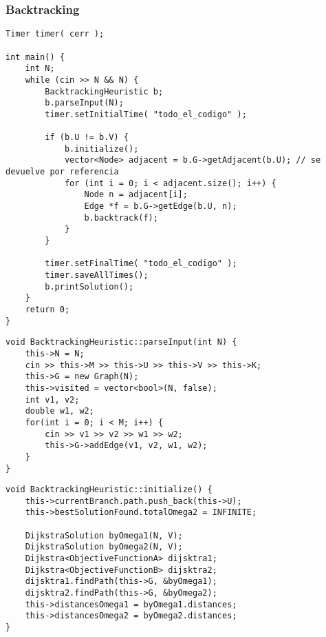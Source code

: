 
\subsubsection{Backtracking}


\begin{lstlisting}[caption=backtracking.cpp]
Timer timer( cerr );

int main() {
    int N;
    while (cin >> N && N) {
        BacktrackingHeuristic b;
        b.parseInput(N);
        timer.setInitialTime( "todo_el_codigo" );
        
        if (b.U != b.V) {
            b.initialize();
            vector<Node> adjacent = b.G->getAdjacent(b.U); // se devuelve por referencia
            for (int i = 0; i < adjacent.size(); i++) {
                Node n = adjacent[i];
                Edge *f = b.G->getEdge(b.U, n);
                b.backtrack(f);
            }
        }
        
        timer.setFinalTime( "todo_el_codigo" );
        timer.saveAllTimes();
        b.printSolution();
    }
    return 0;
}
\end{lstlisting}
\begin{lstlisting}[caption=BacktrackingHeuristic::parseInput()]
void BacktrackingHeuristic::parseInput(int N) {
    this->N = N;
    cin >> this->M >> this->U >> this->V >> this->K;
    this->G = new Graph(N);
    this->visited = vector<bool>(N, false);
    int v1, v2;
    double w1, w2;
    for(int i = 0; i < M; i++) {
        cin >> v1 >> v2 >> w1 >> w2;
        this->G->addEdge(v1, v2, w1, w2);
    }
}
\end{lstlisting}
\begin{lstlisting}[caption=BacktrackingHeuristic::initialize()]
void BacktrackingHeuristic::initialize() {
    this->currentBranch.path.push_back(this->U);
    this->bestSolutionFound.totalOmega2 = INFINITE;
    
    DijkstraSolution byOmega1(N, V);
    DijkstraSolution byOmega2(N, V);
    Dijkstra<ObjectiveFunctionA> dijsktra1; 
    Dijkstra<ObjectiveFunctionB> dijsktra2; 
    dijsktra1.findPath(this->G, &byOmega1);
    dijsktra2.findPath(this->G, &byOmega2);
    this->distancesOmega1 = byOmega1.distances;
    this->distancesOmega2 = byOmega2.distances;
}
\end{lstlisting}
